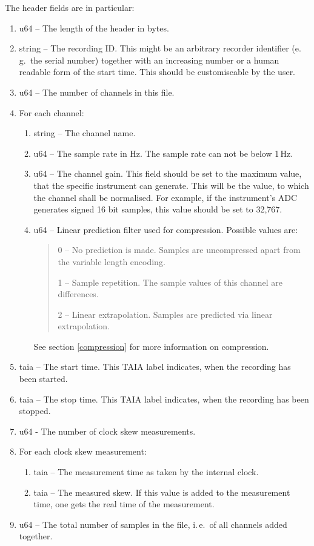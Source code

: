 \documentclass[DIV=10]{scrartcl}
\begin{document}
The header fields are in particular:
\begin{enumerate}
  \item u64 ­­­­– The length of the header in bytes.
  \item string – The recording ID.
  This might be an arbitrary recorder identifier (e.\,g.\ the serial number) together with an increasing number or a human readable form of the start time.
  This should be customiseable by the user.
  \item u64 – The number of channels in this file.
  \item For each channel:
  \begin{enumerate}
    \item string – The channel name.
    \item u64 – The sample rate in Hz.
    The sample rate can not be below 1\,Hz.
    \item u64 – The channel gain.
    This field should be set to the maximum value, that the specific instrument can generate.
    This will be the value, to which the channel shall be normalised.
    For example, if the instrument’s ADC generates signed 16 bit samples, this value should be set to 32,767.
    \item u64 – Linear prediction filter used for compression.
    Possible values are:
    \begin{quote}
      0 – No prediction is made. Samples are uncompressed apart from the variable length encoding.

      1 – Sample repetition. The sample values of this channel are differences.

      2 – Linear extrapolation. Samples are predicted via linear extrapolation.
    \end{quote}
    See section \ref{compression} for more information on compression.
  \end{enumerate}
  \item taia – The start time.
  This TAIA label indicates, when the recording has been started.
  \item taia – The stop time.
  This TAIA label indicates, when the recording has been stopped.
  \item u64 - The number of clock skew measurements.
  \item For each clock skew measurement:
  \begin{enumerate}
    \item taia – The measurement time as taken by the internal clock.
    \item taia – The measured skew.
    If this value is added to the measurement time, one gets the real time of the measurement.
  \end{enumerate}
  \item u64 – The total number of samples in the file, i.\,e.\ of all channels added together.
\end{enumerate}
\end{document}
